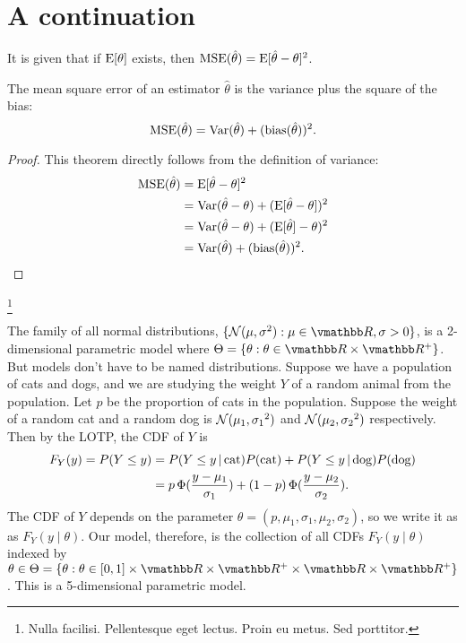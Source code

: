 \documentclass[centertitle]{notes}
\begin{document}
  \section{A continuation}
  \lipsum[8]
  \begin{proposition}
    It is given that if $\operatorname{E}[\theta]$ exists, then $\operatorname{MSE}(\hat\theta) = \operatorname{E}[\hat\theta - \theta]^2$.
  \end{proposition}
  \begin{theorem}[Theorem]
    The mean square error of an estimator $\hat\theta$ is the variance plus the square of the bias: $$\operatorname{MSE}(\hat\theta) = \operatorname{Var}(\hat\theta) + (\operatorname{bias}(\hat\theta))^2.$$
  \end{theorem}
  \begin{proof} This theorem directly follows from the definition of variance:
    \begin{align*}
      \operatorname{MSE}(\hat\theta) &= \operatorname{E}[\hat\theta - \theta]^2 \\
                       &= \operatorname{Var}(\hat\theta - \theta) + (\operatorname{E}[\hat\theta - \theta])^2 \\
                       &= \operatorname{Var}(\hat\theta - \theta) + (\operatorname{E}[\hat\theta] - \theta)^2 \\
                       &= \operatorname{Var}(\hat\theta) + (\operatorname{bias}(\hat\theta))^2.
    \end{align*}
  \end{proof}
  \lipsum[9]\footnote{Nulla facilisi. Pellentesque eget lectus. Proin eu metus. Sed porttitor.}
  \begin{example}
    The family of all normal distributions, $\{\N(\mu, \sigma^2) : \mu \in \R, \sigma > 0\}$, is a 2-dimensional parametric model where $\Theta = \{\theta : \theta \in \R \times \R^+\}$. But models don't have to be named distributions. Suppose we have a population of cats and dogs, and we are studying the weight $Y$ of a random animal from the population. Let $p$ be the proportion of cats in the population. Suppose the weight of a random cat and a random dog is $\mathcal N(\mu_1, {\sigma_1}^2)$ and $\mathcal N(\mu_2, {\sigma_2}^2)$ respectively. Then by the LOTP, the CDF of $Y$ is 
    \begin{align*}
      F_Y(y) = P(Y \leq y) &= P(Y \leq y \,|\, \text{cat})P(\text{cat}) + P(Y \leq y \,|\, \text{dog})P(\text{dog}) \\
                          &= p\,\Phi(\frac{y - \mu_1}{\sigma_1}) + (1-p)\,\Phi(\frac{y - \mu_2}{\sigma_2}).
    \end{align*}
    The CDF of $Y$ depends on the parameter $\theta = (p, \mu_1, \sigma_1, \mu_2, \sigma_2)$, so we write it as as $F_Y(y \mid \theta)$. Our model, therefore, is the collection of all CDFs $F_Y(y \mid \theta)$ indexed by $\theta \in \Theta =\{\theta : \theta \in [0, 1] \times \R \times \R^+ \times \R \times \R^+\}$. This is a 5-dimensional parametric model.
  \end{example}
\end{document}
